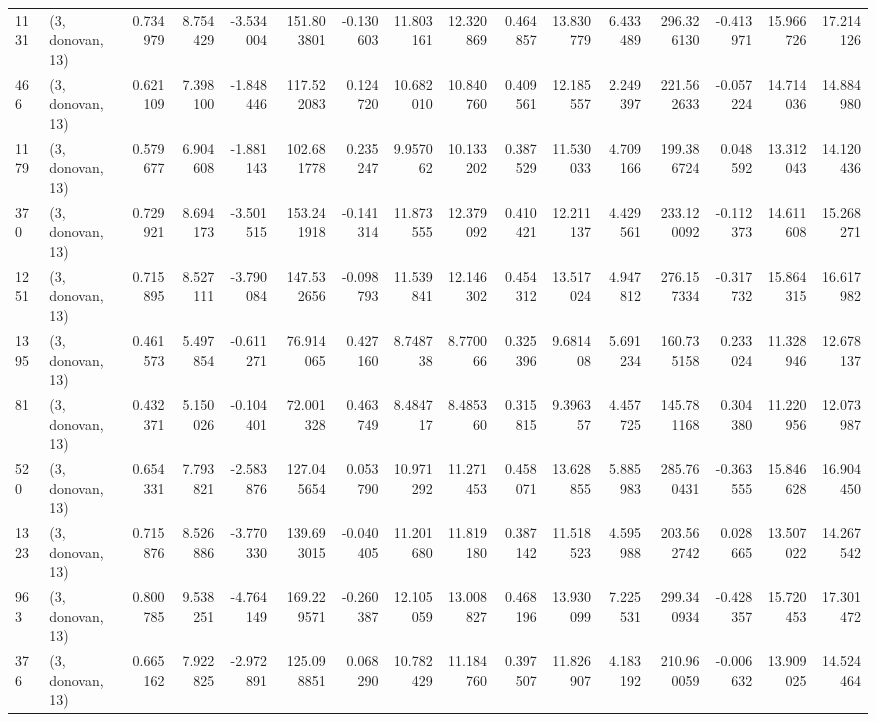 \begin{tabular}{llrrrrrrrrrrrrrr}
1131 &  (3, donovan, 13) &   0.734979 &   8.754429 &  -3.534004 &    151.803801 &   -0.130603 &   11.803161 &   12.320869 &  0.464857 &  13.830779 &   6.433489 &   296.326130 &  -0.413971 &  15.966726 &  17.214126 \\
466  &  (3, donovan, 13) &   0.621109 &   7.398100 &  -1.848446 &    117.522083 &    0.124720 &   10.682010 &   10.840760 &  0.409561 &  12.185557 &   2.249397 &   221.562633 &  -0.057224 &  14.714036 &  14.884980 \\
1179 &  (3, donovan, 13) &   0.579677 &   6.904608 &  -1.881143 &    102.681778 &    0.235247 &    9.957062 &   10.133202 &  0.387529 &  11.530033 &   4.709166 &   199.386724 &   0.048592 &  13.312043 &  14.120436 \\
370  &  (3, donovan, 13) &   0.729921 &   8.694173 &  -3.501515 &    153.241918 &   -0.141314 &   11.873555 &   12.379092 &  0.410421 &  12.211137 &   4.429561 &   233.120092 &  -0.112373 &  14.611608 &  15.268271 \\
1251 &  (3, donovan, 13) &   0.715895 &   8.527111 &  -3.790084 &    147.532656 &   -0.098793 &   11.539841 &   12.146302 &  0.454312 &  13.517024 &   4.947812 &   276.157334 &  -0.317732 &  15.864315 &  16.617982 \\
1395 &  (3, donovan, 13) &   0.461573 &   5.497854 &  -0.611271 &     76.914065 &    0.427160 &    8.748738 &    8.770066 &  0.325396 &   9.681408 &   5.691234 &   160.735158 &   0.233024 &  11.328946 &  12.678137 \\
81   &  (3, donovan, 13) &   0.432371 &   5.150026 &  -0.104401 &     72.001328 &    0.463749 &    8.484717 &    8.485360 &  0.315815 &   9.396357 &   4.457725 &   145.781168 &   0.304380 &  11.220956 &  12.073987 \\
520  &  (3, donovan, 13) &   0.654331 &   7.793821 &  -2.583876 &    127.045654 &    0.053790 &   10.971292 &   11.271453 &  0.458071 &  13.628855 &   5.885983 &   285.760431 &  -0.363555 &  15.846628 &  16.904450 \\
1323 &  (3, donovan, 13) &   0.715876 &   8.526886 &  -3.770330 &    139.693015 &   -0.040405 &   11.201680 &   11.819180 &  0.387142 &  11.518523 &   4.595988 &   203.562742 &   0.028665 &  13.507022 &  14.267542 \\
963  &  (3, donovan, 13) &   0.800785 &   9.538251 &  -4.764149 &    169.229571 &   -0.260387 &   12.105059 &   13.008827 &  0.468196 &  13.930099 &   7.225531 &   299.340934 &  -0.428357 &  15.720453 &  17.301472 \\
376  &  (3, donovan, 13) &   0.665162 &   7.922825 &  -2.972891 &    125.098851 &    0.068290 &   10.782429 &   11.184760 &  0.397507 &  11.826907 &   4.183192 &   210.960059 &  -0.006632 &  13.909025 &  14.524464 \\

\end{tabular}
